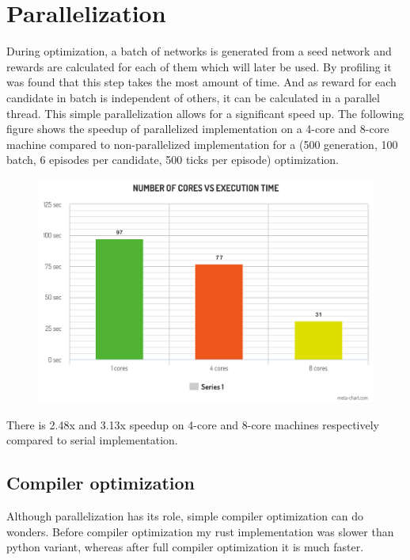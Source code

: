 \documentclass[12pt]{article}
\begin{document}
\section{Parallelization}
During optimization, a batch of networks is generated from a seed network and rewards are calculated for each of them which will later be used.
By profiling it was found that this step takes the most amount of time.
And as reward for each candidate in batch is independent of others, it can be calculated in a parallel thread.
This simple parallelization allows for a significant speed up.
The following figure shows the speedup of parallelized implementation on a 4-core and 8-core machine compared to non-parallelized implementation for a (500 generation, 100 batch, 6 episodes per candidate, 500 ticks per episode) optimization.

\begin{figure}[h!]
\includegraphics[width=15cm]{parallelize.png}
\centering
\end{figure}

There is 2.48x and 3.13x speedup on 4-core and 8-core machines respectively compared to serial implementation.

\subsection{Compiler optimization}
Although parallelization has its role, simple compiler optimization can do wonders.
Before compiler optimization my rust implementation was slower than python variant, whereas after full compiler optimization it is much faster.
\end{document}
